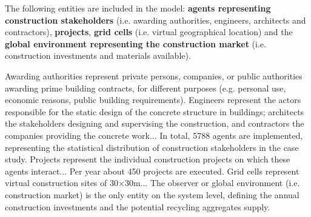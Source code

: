 \begin{guidingbox}
  \begin{tcbitemize}
    \item[\gddarkredb{\arrowbullet}] 
    \item[\gddarkcornflowerblueb{\arrowbullet}] 
    \item[\gddarkgreenb{\arrowbullet}] 
    \item[\gddarkpurpleb{\arrowbullet}] 
    \item[\gddarkorangeb{\arrowbullet}] 
  \end{tcbitemize}
\end{guidingbox}


{
  \color{gddarkredb}
  The following entities are included in the model: \textbf{agents representing construction stakeholders} (i.e. awarding authorities, engineers, architects and contractors), \textbf{projects}, \textbf{grid cells} (i.e. virtual geographical location) and the \textbf{global environment representing the construction market} (i.e. construction investments and materials available).

  Awarding authorities represent private persons, companies, or public authorities awarding prime building contracts, for different purposes (e.g. personal use, economic reasons, public building requirements). Engineers represent the actors responsible for the static design of the concrete structure in buildings; architects the stakeholders designing and supervising the construction, and contractors the companies providing the concrete work... In total, 5788 agents are implemented, representing the statistical distribution of construction stakeholders in the case study. Projects represent the individual construction projects on which these agents interact... Per year about 450 projects are executed. Grid cells represent virtual construction sites of 30×30m... The observer or global environment (i.e. construction market) is the only entity on the system level, defining the annual construction investments and the potential recycling aggregates supply.
}


